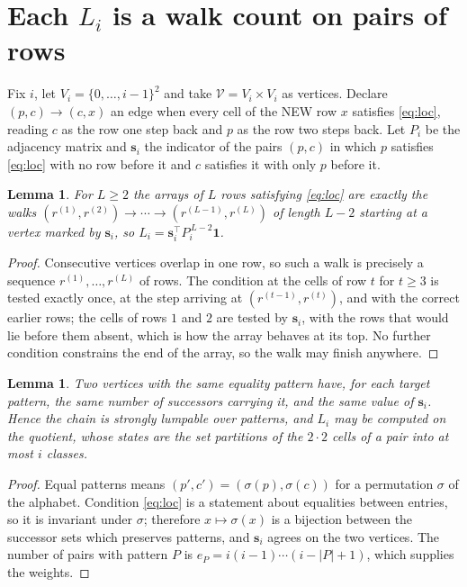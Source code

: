 \documentclass[11pt,a4paper]{article}
\theoremstyle{plain}
\newtheorem{lemma}[theorem]{Lemma}
\theoremstyle{definition}
\begin{document}
\section{Each $L_i$ is a walk count on pairs of rows}

Fix $i$, let $V_i=\{0,\dots,i-1\}^{2}$ and take $\mathcal V=V_i\times V_i$ as vertices.
Declare $(p,c)\to(c,x)$ an edge when every cell of the NEW row $x$ satisfies
\eqref{eq:loc}, reading $c$ as the row one step back and $p$ as the row two steps
back. Let $P_i$ be the adjacency matrix and $\mathbf{s}_i$ the indicator of the pairs
$(p,c)$ in which $p$ satisfies \eqref{eq:loc} with no row before it and $c$ satisfies it
with only $p$ before it.

\begin{lemma}\label{lem:walk}
For $L\ge2$ the arrays of $L$ rows satisfying \eqref{eq:loc} are exactly the walks
$(r^{(1)},r^{(2)})\to\cdots\to(r^{(L-1)},r^{(L)})$ of length $L-2$ starting at a
vertex marked by $\mathbf{s}_i$, so
$L_i=\mathbf{s}_i^{\!\top}P_i^{\,L-2}\mathbf{1}$.
\end{lemma}

\begin{proof}
Consecutive vertices overlap in one row, so such a walk is precisely a sequence
$r^{(1)},\dots,r^{(L)}$ of rows. The condition at the cells of row $t$ for $t\ge3$
is tested exactly once, at the step arriving at $(r^{(t-1)},r^{(t)})$, and with the
correct earlier rows; the cells of rows $1$ and $2$ are tested by $\mathbf{s}_i$, with
the rows that would lie before them absent, which is how the array behaves at its top. No
further condition constrains the end of the array, so the walk may finish anywhere.
\end{proof}

\begin{lemma}\label{lem:lump}
Two vertices with the same equality pattern have, for each target pattern, the same number of
successors carrying it, and the same value of $\mathbf{s}_i$. Hence the chain is strongly
lumpable over patterns, and $L_i$ may be computed on the quotient, whose states are the set
partitions of the $2\cdot2$ cells of a pair into at most $i$ classes.
\end{lemma}

\begin{proof}
Equal patterns means $(p',c')=(\sigma(p),\sigma(c))$ for a permutation $\sigma$ of the
alphabet. Condition \eqref{eq:loc} is a statement about equalities between entries, so it is
invariant under $\sigma$; therefore $x\mapsto\sigma(x)$ is a bijection between the successor
sets which preserves patterns, and $\mathbf{s}_i$ agrees on the two vertices. The number of
pairs with pattern $P$ is $e_P=i(i-1)\cdots(i-|P|+1)$, which supplies the weights.
\end{proof}
\end{document}
